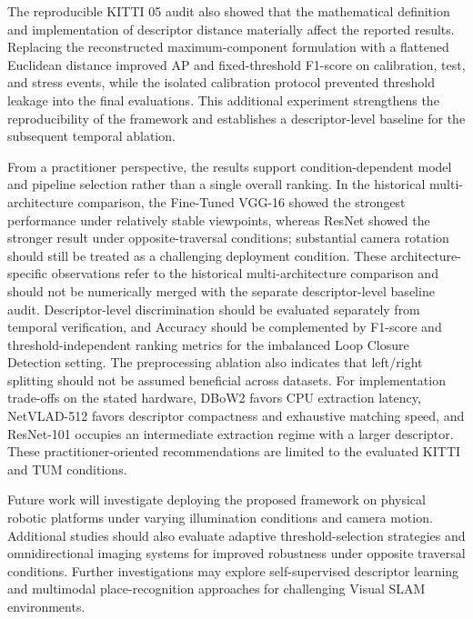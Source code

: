 \documentclass{ieeeaccess}
\newenvironment{revisionblock}
{%
  \par
  \begingroup
  \setlength{\fboxsep}{1pt}%
  \setlength{\OuterFrameSep}{0pt}%
  \def\FrameCommand##1{%
    \colorbox{white}{\color{revisionred}##1}%
  }%
  \MakeFramed{%
    \advance\hsize-2\fboxsep
    \FrameRestore
  }%
}
{%
  \endMakeFramed
  \endgroup
  \par
}
\renewenvironment{revisionblock}
  {\par\begingroup\color{revisionred}}
  {\par\endgroup}
\begin{document}
\begin{revisionblock}
The reproducible KITTI 05 audit also showed that the mathematical definition and implementation of descriptor distance materially affect the reported results. Replacing the reconstructed maximum-component formulation with a flattened Euclidean distance improved AP and fixed-threshold F1-score on calibration, test, and stress events, while the isolated calibration protocol prevented threshold leakage into the final evaluations. This additional experiment strengthens the reproducibility of the framework and establishes a descriptor-level baseline for the subsequent temporal ablation.
\end{revisionblock}

\begin{revisionblock}
From a practitioner perspective, the results support condition-dependent model and pipeline selection rather than a single overall ranking. In the historical multi-architecture comparison, the Fine-Tuned VGG-16 showed the strongest performance under relatively stable viewpoints, whereas ResNet showed the stronger result under opposite-traversal conditions; substantial camera rotation should still be treated as a challenging deployment condition. These architecture-specific observations refer to the historical multi-architecture comparison and should not be numerically merged with the separate descriptor-level baseline audit. Descriptor-level discrimination should be evaluated separately from temporal verification, and Accuracy should be complemented by F1-score and threshold-independent ranking metrics for the imbalanced Loop Closure Detection setting. The preprocessing ablation also indicates that left/right splitting should not be assumed beneficial across datasets. For implementation trade-offs on the stated hardware, DBoW2 favors CPU extraction latency, NetVLAD-512 favors descriptor compactness and exhaustive matching speed, and ResNet-101 occupies an intermediate extraction regime with a larger descriptor. These practitioner-oriented recommendations are limited to the evaluated KITTI and TUM conditions.
\end{revisionblock}

Future work will investigate deploying the proposed framework on physical robotic platforms under varying illumination conditions and camera motion. Additional studies should also evaluate adaptive threshold-selection strategies and omnidirectional imaging systems for improved robustness under opposite traversal conditions. Further investigations may explore self-supervised descriptor learning and multimodal place-recognition approaches for challenging Visual SLAM environments.
\end{document}
